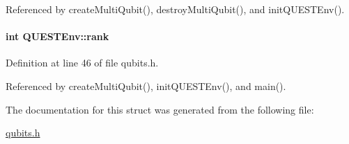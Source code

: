 Referenced by create\+Multi\+Qubit(), destroy\+Multi\+Qubit(), and init\+Q\+U\+E\+S\+T\+Env().

\paragraph[{\texorpdfstring{rank}{rank}}]{\setlength{\rightskip}{0pt plus 5cm}int Q\+U\+E\+S\+T\+Env\+::rank}\hypertarget{structQUESTEnv_a1bdb6d425a2ce6a468f93929c0b26d73}{}\label{structQUESTEnv_a1bdb6d425a2ce6a468f93929c0b26d73}


Definition at line 46 of file qubits.\+h.



Referenced by create\+Multi\+Qubit(), init\+Q\+U\+E\+S\+T\+Env(), and main().



The documentation for this struct was generated from the following file\+:\begin{DoxyCompactItemize}
\item 
\hyperlink{qubits_8h}{qubits.\+h}\end{DoxyCompactItemize}
